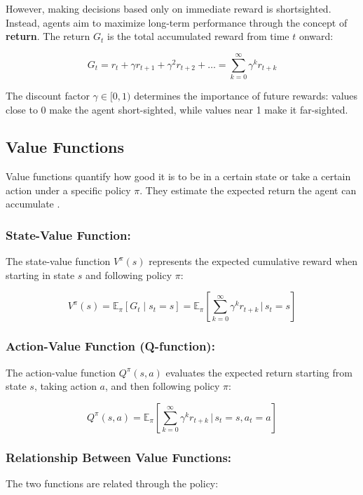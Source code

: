 \documentclass[../Main.tex]{subfiles}
\begin{document}
However, making decisions based only on immediate reward is shortsighted. Instead, agents aim to maximize long-term performance through the concept of \textbf{return}. The return $G_t$ is the total accumulated reward from time $t$ onward:

\begin{equation}
    G_t = r_t + \gamma r_{t+1} + \gamma^2 r_{t+2} + \dots = \sum_{k=0}^{\infty} \gamma^k r_{t+k}
\end{equation}

The discount factor $\gamma \in [0, 1)$ determines the importance of future rewards: values close to 0 make the agent short-sighted, while values near 1 make it far-sighted.

\subsection{Value Functions}

Value functions quantify how good it is to be in a certain state or take a certain action under a specific policy $\pi$. They estimate the expected return the agent can accumulate \cite{sutton2018reinforcement}.

\subsubsection{State-Value Function:}
The state-value function $V^{\pi}(s)$ represents the expected cumulative reward when starting in state $s$ and following policy $\pi$:

\begin{equation}
    V^{\pi}(s) = \mathbb{E}_\pi\left[ G_t \mid s_t = s \right] = \mathbb{E}_\pi\left[\sum_{k=0}^{\infty} \gamma^k r_{t+k} \,\bigg|\, s_t = s\right]
\end{equation}

\subsubsection{Action-Value Function (Q-function):}
The action-value function $Q^{\pi}(s, a)$ evaluates the expected return starting from state $s$, taking action $a$, and then following policy $\pi$:

\begin{equation}
    Q^{\pi}(s, a) = \mathbb{E}_\pi\left[\sum_{k=0}^{\infty} \gamma^k r_{t+k} \,\bigg|\, s_t = s, a_t = a\right]
\end{equation}

\subsubsection{Relationship Between Value Functions:}
The two functions are related through the policy:
\end{document}
